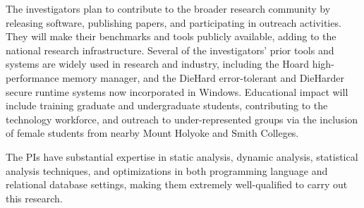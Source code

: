 
The investigators plan to contribute to the broader research community
by releasing software, publishing papers, and participating in outreach activities.  They will make their
benchmarks and tools publicly available, adding to the national
research infrastructure. Several of the investigators' prior tools and
systems are widely used in research and industry, including the Hoard
high-performance memory manager, and the DieHard error-tolerant and
DieHarder secure runtime systems now incorporated in
Windows. Educational impact will include training graduate and
undergraduate students, contributing to the technology workforce, and
outreach to under-represented groups via the inclusion of female
students from nearby Mount Holyoke and Smith Colleges.


The PIs have substantial expertise in static analysis, dynamic
analysis, statistical analysis techniques, and optimizations in both
programming language and relational database settings, making them
extremely well-qualified to carry out this research.

